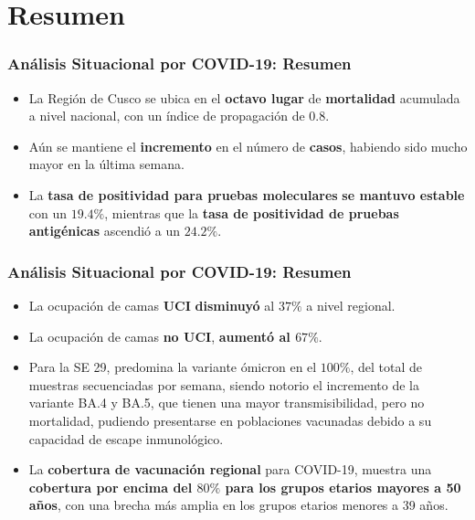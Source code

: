 \documentclass[xcolor=table]{beamer}
\begin{document}
\section{Resumen}
\begin{frame}[label=Resumen]
	\frametitle{Análisis Situacional por COVID-19: Resumen}
	\vspace{-.5cm}
	\begin{itemize}
		\item La Región de Cusco se ubica en el \textbf{\color{mycolor4}octavo lugar} de \textbf{\color{mycolor3}mortalidad} acumulada a nivel nacional, con un índice de propagación de $0.8 $.   
		\item Aún se mantiene el \textbf{\color{mycolor4} incremento} en el número de \textbf{\color{mycolor3}casos}, habiendo sido mucho mayor en la última semana. 
		\item La \textbf{\color{mycolor3}tasa de positividad para pruebas moleculares} \textbf{\color{mycolor4}se mantuvo estable} con un $19.4\%$, mientras que la \textbf{\color{mycolor3}tasa de positividad de pruebas antigénicas} ascendió a un $24.2\%$.
	\end{itemize}
\end{frame}

\begin{frame}
	\frametitle{Análisis Situacional por COVID-19: Resumen}
	\vspace{-.5cm}
	\begin{itemize}
	\item La ocupación de camas \textbf{\color{mycolor3}UCI} \textbf{\color{mycolor4}disminuyó} al $37\%$ a nivel regional.
	\item La ocupación de camas \textbf{\color{mycolor3}no UCI}, \textbf{\color{mycolor4}aumentó al $67\%$}. 
	\item Para la SE 29, predomina la variante ómicron en el $100\%$, del total de muestras secuenciadas por semana, siendo notorio el incremento de la variante BA.4 y BA.5, que tienen una mayor transmisibilidad, pero no mortalidad, pudiendo presentarse en poblaciones vacunadas debido a su capacidad de escape inmunológico.
	\item La \textbf{\color{mycolor3}cobertura de vacunación regional} para COVID-19, muestra una \textbf{\color{mycolor4}cobertura por encima del $80\%$ para los grupos etarios mayores a 50 años}, con una brecha más amplia en los grupos etarios menores a 39 años.
	
	\end{itemize}
\end{frame}
\end{document}
